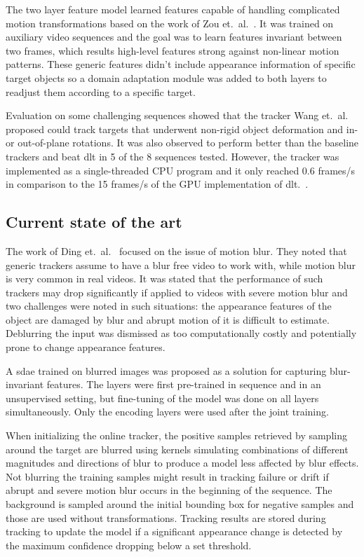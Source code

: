 The two layer feature model learned features capable of handling complicated motion
transformations based on the work of Zou et.~al.~\cite{INVARIANT_FEATS}. It was trained
on auxiliary video sequences and the goal was to learn features invariant between two
frames, which results high-level features strong against non-linear motion patterns. These
generic features didn't include appearance information of specific target objects so a
domain adaptation module was added to both layers to readjust them according to a
specific target.~\cite{LEARNED_HIERARCH}

Evaluation on some challenging sequences showed that the tracker Wang et.~al.~\cite{LEARNED_HIERARCH}
proposed could track targets that underwent non-rigid object deformation and in- or
out-of-plane rotations. It was also observed to perform better than the baseline trackers
and beat \ac{dlt} in 5 of the 8 sequences tested. However, the tracker was implemented
as a single-threaded CPU program and it only reached 0.6 frames/s in comparison to the 15
frames/s of the GPU implementation of \ac{dlt}.~\cite{DLT}.

\subsection{Current state of the art}

The work of Ding et.~al.~\cite{BLUR_TRACK} focused on the issue of motion blur. They noted
that generic trackers assume to have a blur free video to work with, while motion blur is
very common in real videos. It was stated that the performance of such trackers may drop
significantly if applied to videos with severe motion blur and two challenges were
noted in such situations: the appearance features of the object are damaged by blur
and abrupt motion of it is difficult to estimate. Deblurring the input was dismissed as
too computationally costly and potentially prone to change appearance features.~\cite{BLUR_TRACK}

A \ac{sdae} trained on blurred images was proposed as a solution for capturing blur-invariant
features. The layers were first pre-trained in sequence and in an unsupervised setting,
but fine-tuning of the model was done on all layers simultaneously. Only the encoding
layers were used after the joint training.~\cite{BLUR_TRACK}

When initializing the online tracker, the positive samples retrieved by sampling around
the target are blurred using kernels simulating combinations of different magnitudes
and directions of blur to produce a model less affected by blur effects. Not blurring
the training samples might result in tracking failure or drift if abrupt and severe
motion blur occurs in the beginning of the sequence. The background is sampled around
the initial bounding box for negative samples and those are used without transformations.
Tracking results are stored during tracking to update the model if a significant
appearance change is detected by the maximum confidence dropping below a set threshold.~\cite{BLUR_TRACK}

